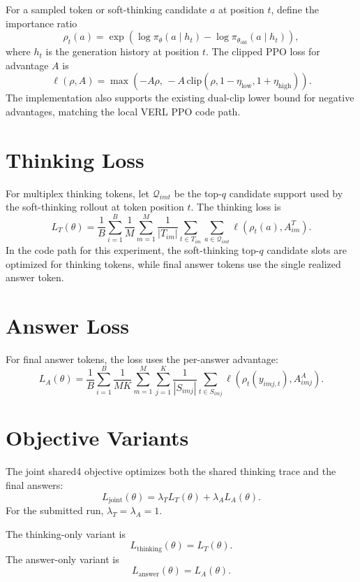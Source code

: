 \documentclass[11pt]{article}
\begin{document}
For a sampled token or soft-thinking candidate \(a\) at position \(t\), define
the importance ratio
\[
  \rho_t(a)
  =
  \exp\left(
    \log \pi_\theta(a \mid h_t)
    -
    \log \pi_{\theta_{\mathrm{old}}}(a \mid h_t)
  \right),
\]
where \(h_t\) is the generation history at position \(t\). The clipped PPO loss
for advantage \(A\) is
\[
  \ell(\rho, A)
  =
  \max\left(
    -A\rho,\,
    -A\,\mathrm{clip}(\rho, 1-\eta_{\mathrm{low}}, 1+\eta_{\mathrm{high}})
  \right).
\]
The implementation also supports the existing dual-clip lower bound for
negative advantages, matching the local VERL PPO code path.

\section{Thinking Loss}

For multiplex thinking tokens, let \(\mathcal Q_{imt}\) be the top-\(q\)
candidate support used by the soft-thinking rollout at token position \(t\).
The thinking loss is
\[
  L_T(\theta)
  =
  \frac{1}{B}
  \sum_{i=1}^{B}
  \frac{1}{M}
  \sum_{m=1}^{M}
  \frac{1}{|T_{im}|}
  \sum_{t\in T_{im}}
  \sum_{a\in \mathcal Q_{imt}}
  \ell\left(\rho_t(a), A^T_{im}\right).
\]
In the code path for this experiment, the soft-thinking top-\(q\) candidate
slots are optimized for thinking tokens, while final answer tokens use the
single realized answer token.

\section{Answer Loss}

For final answer tokens, the loss uses the per-answer advantage:
\[
  L_A(\theta)
  =
  \frac{1}{B}
  \sum_{i=1}^{B}
  \frac{1}{MK}
  \sum_{m=1}^{M}
  \sum_{j=1}^{K}
  \frac{1}{|S_{imj}|}
  \sum_{t\in S_{imj}}
  \ell\left(\rho_t(y_{imj,t}), A^A_{imj}\right).
\]

\section{Objective Variants}

The joint shared4 objective optimizes both the shared thinking trace and the
final answers:
\[
  L_{\mathrm{joint}}(\theta)
  =
  \lambda_T L_T(\theta) + \lambda_A L_A(\theta).
\]
For the submitted run, \(\lambda_T=\lambda_A=1\).

The thinking-only variant is
\[
  L_{\mathrm{thinking}}(\theta) = L_T(\theta).
\]
The answer-only variant is
\[
  L_{\mathrm{answer}}(\theta) = L_A(\theta).
\]
\end{document}
